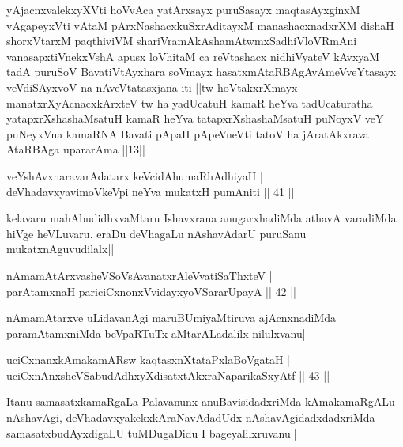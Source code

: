 \begin{shl}
yAjacnxvalekxyXVti hoVvAca yatArxsayx puruSasayx maqtasAyxginxM vAgapeyxVti vAtaM pArxNashacxkuSxrAditayxM manashacxnadxrXM dishaH shorxVtarxM paqthiviVM shariVramAkAshamAtwmxSadhiVloVRmAni vanasapxtiVnekxVshA apusx loVhitaM ca reVtashacx nidhiVyateV kAvxyaM tadA puruSoV BavatiVtAyxhara soVmayx hasatxmAtaRBAgAvAmeVveYtasayx veVdiSAyxvoV na nAveVtatasxjana iti ||tw hoVtakxrXmayx manatxrXyAcnacxkArxteV tw ha yadUcatuH kamaR heYva tadUcaturatha yatapxrXshashaMsatuH kamaR heYva tatapxrXshashaMsatuH puNoyxV veY puNeyxVna kamaRNA Bavati pApaH pApeVneVti tatoV ha jAratAkxrava AtaRBAga upararAma ||13||
\end{shl}

\begin{center}
\end{center}


\begin{shl}
veYshAvxnaravarAdatarx keVcidAhumaRhAdhiyaH |\\
deVhadavxyavimoVkeV\s pi neYva mukatxH pumAniti \hfill || 41 ||
\end{shl}


\begin{artha}
kelavaru mahAbudidhxvaMtaru Ishavxrana anugarxhadiMda athavA varadiMda hiVge heVLuvaru. eraDu deVhagaLu nAshavAdarU puruSanu mukatxnAguvudilalx||
\end{artha}


\begin{shl}
nAmamAtArxvasheVSoV\s sAvanatxrAleV\s vatiSaThxteV |\\
parAtamxnaH pariciCxnonxV\s vidayxyoVSararUpayA \hfill || 42 ||
\end{shl}

\begin{artha}
nAmamAtarxve uLidavanAgi maruBUmiyaMtiruva ajAcnxnadiMda paramAtamxniMda beVpaRTuTx 
aMtarALadalilx nilulxvanu||
\end{artha}

\begin{shl}
uciCxnanxkAmakamAR\s sw kaqtasxnXtataPxlaBoVgataH |\\
uciCxnAnxsheVSabudAdhxyXdisatxtAkxraNaparikaSxyAtf \hfill || 43 ||
\end{shl}

\begin{artha}
Itanu samasatxkamaRgaLa Palavanunx anuBavisidadxriMda kAmakamaRgALu nAshavAgi, deVhadavxyakekxkAraNavAdadUdx nAshavAgidadxdadxriMda samasatxbudAyxdigaLU tuMDugaDidu  I bageyalilxruvanu||
\end{artha}

